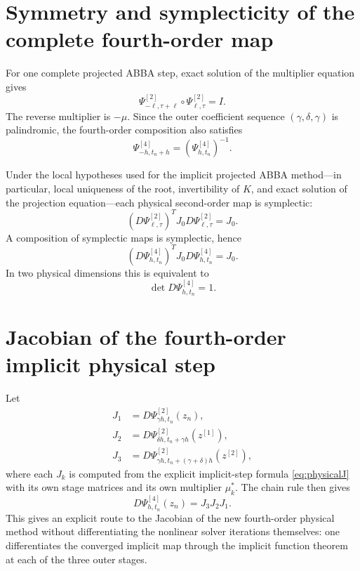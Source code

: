 \documentclass[11pt,a4paper]{article}
\newcommand{\Psitwo}{\Psi^{[2]}}
\newcommand{\Psifour}{\Psi^{[4]}}
\begin{document}
\section{Symmetry and symplecticity of the complete fourth-order map}
For one complete projected ABBA step, exact solution of the multiplier equation gives
\begin{equation}
    \Psitwo_{-\ell,\tau+\ell}
    \circ
    \Psitwo_{\ell,\tau}
    =I.
\end{equation}
The reverse multiplier is $-\mu$. Since the outer coefficient sequence $(\gamma,\delta,\gamma)$ is palindromic, the fourth-order composition also satisfies
\begin{equation}
    \Psifour_{-h,t_n+h}
    =\left(\Psifour_{h,t_n}\right)^{-1}.
\end{equation}

Under the local hypotheses used for the implicit projected ABBA method---in particular, local uniqueness of the root, invertibility of $K$, and exact solution of the projection equation---each physical second-order map is symplectic:
\begin{equation}
    \left(D\Psitwo_{\ell,\tau}\right)^TJ_0
    D\Psitwo_{\ell,\tau}
    =J_0.
\end{equation}
A composition of symplectic maps is symplectic, hence
\begin{equation}
    \boxed{
    \left(D\Psifour_{h,t_n}\right)^TJ_0
    D\Psifour_{h,t_n}
    =J_0.
    }
\end{equation}
In two physical dimensions this is equivalent to
\begin{equation}
    \det D\Psifour_{h,t_n}=1.
\end{equation}

\section{Jacobian of the fourth-order implicit physical step}
Let
\begin{align}
    J_1&=D\Psitwo_{\gamma h,t_n}(z_n),\\
    J_2&=D\Psitwo_{\delta h,t_n+\gamma h}(z^{[1]}),\\
    J_3&=D\Psitwo_{\gamma h,t_n+(\gamma+\delta)h}(z^{[2]}),
\end{align}
where each $J_k$ is computed from the explicit implicit-step formula \eqref{eq:physicalJ} with its own stage matrices and its own multiplier $\mu_k^*$. The chain rule then gives
\begin{equation}
    \boxed{
    D\Psifour_{h,t_n}(z_n)=J_3J_2J_1.
    }
    \label{eq:totalJ}
\end{equation}
This gives an explicit route to the Jacobian of the new fourth-order physical method without differentiating the nonlinear solver iterations themselves: one differentiates the converged implicit map through the implicit function theorem at each of the three outer stages.
\end{document}
